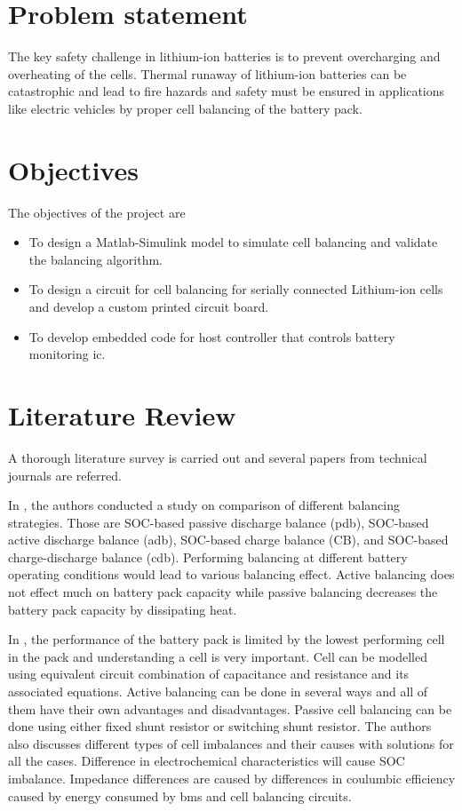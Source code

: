 \section[Problem statement]{\textbf{Problem statement}}

The key safety challenge in lithium-ion batteries is to prevent overcharging and overheating of the cells. Thermal runaway of lithium-ion batteries can be catastrophic and lead to fire hazards and safety must be ensured in applications like electric vehicles by proper cell balancing of the battery pack.

\section[Objectives]{\textbf{Objectives}}
The objectives of the project are
\begin{itemize}
\item To design a Matlab-Simulink model to simulate cell balancing and validate the balancing algorithm.
\item To design a circuit for cell balancing for serially connected Lithium-ion cells and develop a custom printed circuit board.
\item To develop embedded code for host controller that controls battery monitoring \acrshort{ic}.
\end{itemize}

\section[Literature Review]{\textbf{Literature Review}}


A thorough literature survey is carried out and several papers from technical journals are referred.

In \cite{ls1}, the authors conducted a study on comparison of different balancing strategies. Those are SOC-based passive discharge balance (\acrshort{pdb}), SOC-based active discharge balance (\acrshort{adb}), SOC-based charge balance (CB), and SOC-based charge-discharge balance (\acrshort{cdb}). Performing balancing at different battery operating conditions would lead to various balancing effect. Active balancing does not effect much on battery pack capacity while passive balancing decreases the battery pack capacity by dissipating heat.   

In \cite{ls2}, the performance of the battery pack is limited by the lowest performing cell in the pack and understanding a cell is very important. Cell can be modelled using equivalent circuit combination of capacitance and resistance and its associated equations. Active balancing can be done in several ways and all of them have their own advantages and disadvantages. Passive cell  balancing can be done using either fixed shunt resistor or switching shunt resistor. The authors also discusses different types of cell imbalances and their causes with solutions for all the cases. Difference in electrochemical characteristics will cause SOC imbalance. Impedance differences are caused by differences in coulumbic efficiency caused by energy consumed by \acrshort{bms} and cell balancing circuits. 

